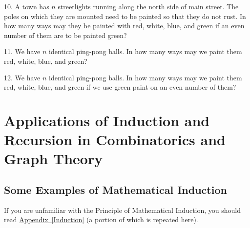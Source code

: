 \documentclass[10pt,]{book}
\theoremstyle{plain}
\theoremstyle{definition}
\theoremstyle{definition}
\numberwithin{equation}{chapter}
\begin{document}
\begin{exerciselist}
\par\smallskip
\item[10.]\marginsymbol[-1em]{} \hypertarget{exercise-10}{}A town has \(n\) streetlights running along the north side of main street.  The poles on which they are mounted need to be painted so that they do not rust.  In how many ways may they be painted with red, white, blue, and green if an even number of them are to be painted green?%
\par\smallskip
\item[11.] \hypertarget{pingpongpaint}{}We have \(n\) identical ping-pong balls.  In how many ways may we paint them red, white, blue, and green?%
\par\smallskip
\item[12.] \hypertarget{exercise-12}{}We have \(n\) identical ping-pong balls.  In how many ways may we paint them red, white, blue, and green if we use green paint on an even number of them?%
\par\smallskip
\end{exerciselist}
\typeout{************************************************}
\typeout{************************************************}
\chapter[{Applications of Induction and Recursion in Combinatorics and Graph Theory}]{Applications of Induction and Recursion in Combinatorics and Graph Theory}\label{InductionRecursion}
\typeout{************************************************}
\typeout{************************************************}
\section[{Some Examples of Mathematical Induction}]{Some Examples of Mathematical Induction}\label{sec_induction-examples}
If you are unfamiliar with the Principle of Mathematical Induction, you should read \hyperref[Induction]{Appendix~\ref{Induction}} (a portion of which is repeated here).%
\typeout{************************************************}
\typeout{************************************************}
\end{document}
